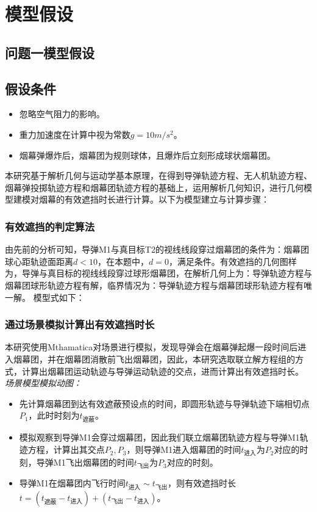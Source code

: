 \documentclass{article}
\begin{document}
\section{模型假设}

\subsection{问题一模型假设}
\subsection{假设条件}
\begin{itemize}
    \item 忽略空气阻力的影响。
    \item 重力加速度在计算中视为常数$g = 10m/s^2$。
    \item 烟幕弹爆炸后，烟幕团为规则球体，且爆炸后立刻形成球状烟幕团。
\end{itemize}
本研究基于解析几何与运动学基本原理，在得到导弹轨迹方程、无人机轨迹方程、烟幕弹投掷轨迹方程和烟幕团轨迹方程的基础上，运用解析几何知识，进行几何模型建模对烟幕的有效遮挡时长进行计算。以下为模型建立与计算步骤：

\subsubsection{有效遮挡的判定算法}

由先前的分析可知，导弹M1与真目标T2的视线线段穿过烟幕团的条件为：烟幕团球心距轨迹面距离$d<10$，在本题中，$d = 0$，满足条件。有效遮挡的几何图样为，导弹与真目标的视线线段穿过球形烟幕团，在解析几何上为：导弹轨迹方程与烟幕团球形轨迹方程有解，临界情况为：导弹轨迹方程与烟幕团球形轨迹方程有唯一解。
模型式如下：
\subsubsection{通过场景模拟计算出有效遮挡时长}
本研究使用Mthamatica对场景进行模拟，发现导弹会在烟幕弹起爆一段时间后进入烟幕团，并在烟幕团消散前飞出烟幕团，因此，本研究选取联立解方程组的方式，计算出烟幕团运动轨迹与导弹运动轨迹的交点，进而计算出有效遮挡时长。
\textit{场景模型模拟动图：}

\begin{itemize}
    \item 先计算烟幕团到达有效遮蔽预设点的时间，即圆形轨迹与导弹轨迹下端相切点$P_1$，此时时刻为$t_\text{遮蔽}$。
    \item 模拟观察到导弹M1会穿过烟幕团，因此我们联立烟幕团轨迹方程与导弹M1轨迹方程，计算出其交点$P_2,P_3$，则导弹M1进入烟幕团的时间$t_{\text{进入}}$为$P_2$对应的时刻，导弹M1飞出烟幕团的时间$t_{\text{飞出}}$为$P_3$对应的时刻。
    \item 导弹M1在烟幕团内飞行时间$t_{\text{进入}} \sim t_{\text{飞出}}$，则有效遮挡时长$t =(t_\text{遮蔽}- t_\text{进入}) + (t_{\text{飞出}} - t_{\text{进入}})$。
\end{itemize}
\end{document}
